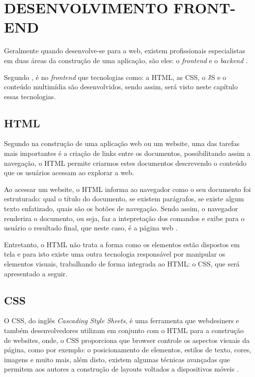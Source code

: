 \section{DESENVOLVIMENTO FRONT-END}

Geralmente quando desenvolve-se para a web, existem profissionais especialistas
em duas áreas da construção de uma aplicação, são eles: o \textit{frontend} e o
\textit{backend} \cite{artigoAvaliacaoEReducaoDoTempoDeRespostaDeSistemasWeb}.

Segundo , é no
\textit{frontend} que tecnologias como: a \ac{HTML}, as \ac{CSS}, o \ac{JS}
e o conteúdo multimídia são desenvolvidos, sendo assim, será visto neste
capítulo essas tecnologias.

\subsection{HTML}

Segundo  na construção de uma aplicação web ou
um website, uma das tarefas mais importantes é a criação de links entre os
documentos, possibilitando assim a navegação, o \acs{HTML} permite criarmos
estes documentos descrevendo o conteúdo que os usuários acessam ao explorar a web.

Ao acessar um website, o \acs{HTML} informa ao navegador como o seu documento
foi estruturado: qual o título do documento, se existem parágrafos, se existe
algum texto enfatizado, quais são os botões de navegação. Sendo assim, o
navegador renderiza o documento, ou seja, faz a intepretação dos
comandos e exibe para o usuário o resultado final, que neste caso, é a página
web \cite{headFirstHTMLWithCSSAndXHTML}.

Entretanto, o \acs{HTML} não trata a forma como os elementos estão dispostos em
tela e para isto existe uma outra tecnologia responsável por manipular os
elementos visuais, trabalhando de forma integrada ao \acs{HTML}:
o \acs{CSS}, que será apresentado a seguir.

\subsection{CSS}

O \ac{CSS}, do inglês \textit{Cascading Style Sheets}, é uma ferramenta
que webdesiners e também desenvolvedores utilizam em conjunto com o \ac{HTML}
para a construção de websites, onde, o \acs{CSS} proporciona que \ac{browser}
controle os aspectos visuais da página, como por exemplo: o posicionamento de elementos,
estilos de texto, cores, imagens e muito mais, além disto, existem algumas
técnicas avançadas que permitem aos autores a construção de layouts voltados a
dispositivos móveis \cite{beginningCSSCascadingStyleSheetsForWebDesign}.

